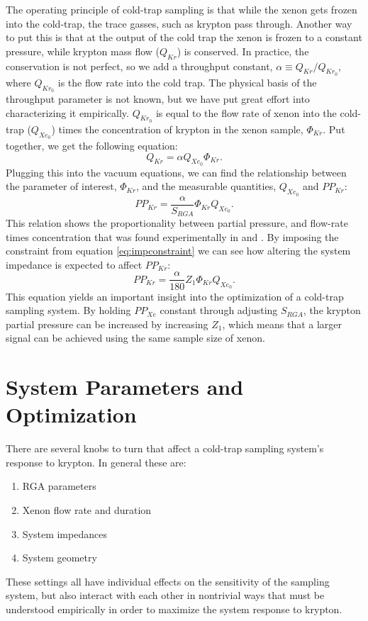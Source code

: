 \documentclass[12pt]{article}
\begin{document}
The operating principle of cold-trap sampling is that while the xenon gets frozen into the cold-trap, the trace gasses, such as krypton pass through. Another way to put this is that at the output of the cold trap the xenon is frozen to a constant pressure, while krypton mass flow ($Q_{Kr}$) is conserved. In practice, the conservation is not perfect, so we add a throughput constant, $\alpha \equiv Q_{Kr}/Q_{Kr_0}$, where $Q_{Kr_0}$ is the flow rate into the cold trap. The physical basis of the throughput parameter is not known, but we have put great effort into characterizing it empirically. $Q_{Kr_0}$ is equal to the flow rate of xenon into the cold-trap ($Q_{Xe_0}$) times the concentration of krypton in the xenon sample, $\Phi_{Kr}$. Put together, we get the following equation: 
\begin{equation}
Q_{Kr}=\alpha Q_{Xe_0}\Phi_{Kr}.
\end{equation}
Plugging this into the vacuum equations, we can find the relationship between the parameter of interest, $\Phi_{Kr}$, and the measurable quantities, $Q_{Xe_0}$ and $PP_{Kr}$:
\begin{equation}
\label{eq:krpres1}
PP_{Kr}=\frac{\alpha}{S_{RGA}}\Phi_{Kr}Q_{Xe_0}.
\end{equation}
This relation shows the proportionality between partial pressure, and flow-rate times concentration that was found experimentally in \cite{sampling_doug} and \cite{sampling_dm}. By imposing the constraint from equation \ref{eq:impconstraint} we can see how altering the system impedance is expected to affect $PP_{Kr}$:
\begin{equation}
\label{eq:krpres2}
PP_{Kr}=\frac{\alpha}{180}Z_{1}\Phi_{Kr}Q_{Xe_0}.
\end{equation}
This equation yields an important insight into the optimization of a cold-trap sampling system. By holding $PP_{Xe}$ constant through adjusting $S_{RGA}$, the krypton partial pressure can be increased by increasing $Z_1$, which means that a larger signal can be achieved using the same sample size of xenon.


\section{System Parameters and Optimization}
There are several knobs to turn that affect a cold-trap sampling system's response to krypton. In general these are:
\begin{enumerate}
\item RGA parameters
\item Xenon flow rate and duration
\item System impedances
\item System geometry
\end{enumerate}
These settings all have individual effects on the sensitivity of the sampling system, but also interact with each other in nontrivial ways that must be understood empirically in order to maximize the system response to krypton.
\end{document}
